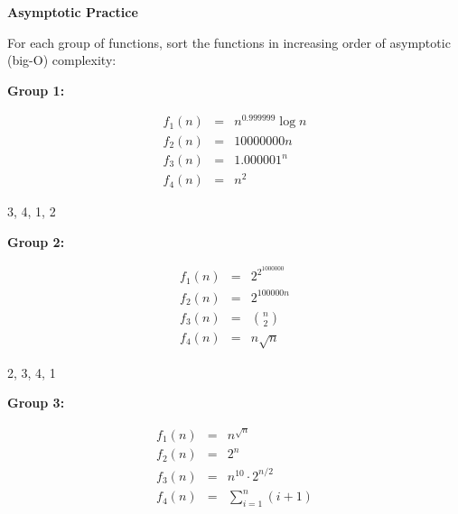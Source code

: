 \documentclass[12pt,twoside]{article}
\begin{document}
\begin{problems}

    \problem {} \textbf{Asymptotic Practice}

    For each group of functions, sort the functions in increasing order of
    asymptotic (big-O) complexity:

    \begin{problemparts}

        \problempart {} \textbf{Group 1:}

        $$
            \begin{array}{rcl}
                f_1(n) & = & n^{0.999999} \log n \\
                f_2(n) & = & 10000000 n          \\
                f_3(n) & = & 1.000001^n          \\
                f_4(n) & = & n^2
            \end{array}
        $$

        \ifsolution \solution{}
            3, 4, 1, 2
        \fi

        \problempart {} \textbf{Group 2:}

        $$
            \begin{array}{rcl}
                f_1(n) & = & 2^{2^{1000000}}            \\
                f_2(n) & = & 2^{100000n}                \\
                f_3(n) & = & \displaystyle \binom{n}{2} \\
                f_4(n) & = & n \sqrt{n}
            \end{array}
        $$

        \ifsolution \solution{}
            2, 3, 4, 1
        \fi

        \problempart {} \textbf{Group 3:}

        $$
            \begin{array}{rcl}
                f_1(n) & = & n^{\sqrt{n}}                          \\
                f_2(n) & = & 2^n                                   \\
                f_3(n) & = & n^{10} \cdot 2^{n / 2}                \\
                f_4(n) & = & \displaystyle\sum_{i = 1}^{n} (i + 1)
            \end{array}
        $$


\end{problemparts}
\end{problems}
\end{document}

